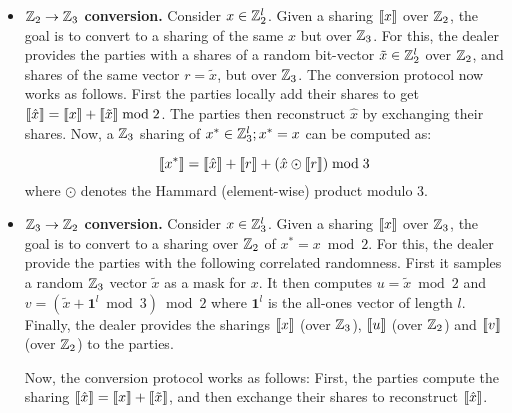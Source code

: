 \begin{itemize}
    \item \textbf{$\mathbb{Z}_2 \to \mathbb{Z}_3$ conversion.} Consider $x \in \mathbb{Z}_2^l$. Given a sharing $\left\llbracket x \right\rrbracket$ over $\mathbb{Z}_2$, the goal is to convert to a sharing of the same $x$ but over $\mathbb{Z}_3$. For this, the dealer provides the parties with a shares of a random bit-vector $\tilde{x} \in \mathbb{Z}_2^l$ over $\mathbb{Z}_2$, and shares of the same vector $r = \tilde{x}$, but over $\mathbb{Z}_3$. The conversion protocol now works as follows. First the parties locally add their shares to get $\left\llbracket \hat{x} \right\rrbracket = \left\llbracket x \right\rrbracket + \left\llbracket \tilde{x} \right\rrbracket \bmod 2$. The parties then reconstruct $\hat{x}$ by exchanging their shares. Now, a $\mathbb{Z}_3$ sharing of $x^* \in \mathbb{Z}_3^l; x^* = x$ can be computed as:

    \[
        \left\llbracket x^* \right\rrbracket = \left\llbracket \hat{x} \right\rrbracket + \left\llbracket r \right\rrbracket + (\hat{x} \odot \left\llbracket r \right\rrbracket) \bmod 3
    \]
    where $\odot$ denotes the Hammard (element-wise) product modulo 3.

    \item \textbf{$\mathbb{Z}_3 \to \mathbb{Z}_2$ conversion.}
    Consider $x \in \mathbb{Z}_3^l$. Given a sharing $\left\llbracket x \right\rrbracket$ over $\mathbb{Z}_3$, the goal is to convert to a sharing over $\mathbb{Z}_2$ of $x^* = x \bmod 2$. For this, the dealer provide the parties with the following correlated randomness. First it samples a random $\mathbb{Z}_3$ vector $\tilde{x}$ as a mask for $x$. It then computes $u = \tilde{x} \bmod 2$ and $v = (\tilde{x} + \textbf{1}^l \bmod 3) \bmod 2$ where $\textbf{1}^l$ is the all-ones vector of length $l$. Finally, the dealer provides the sharings $\left\llbracket x \right\rrbracket$ (over $\mathbb{Z}_3$), $\left\llbracket u \right\rrbracket$ (over $\mathbb{Z}_2$) and $\left\llbracket v \right\rrbracket$ (over $\mathbb{Z}_2$) to the parties.

    \hspace*{1em} Now, the conversion protocol works as follows: First, the parties compute the sharing $\left\llbracket \hat{x} \right\rrbracket = \left\llbracket x \right\rrbracket + \left\llbracket \tilde{x} \right\rrbracket$, and then exchange their shares to reconstruct $\left\llbracket \hat{x} \right\rrbracket$.

\end{itemize}

